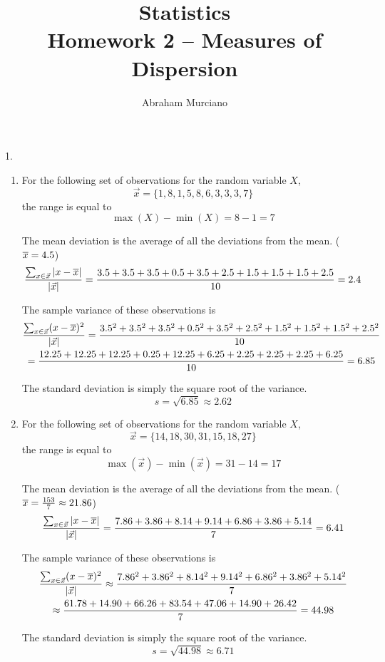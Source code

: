 \documentclass[fleqn]{article}
\title{
	Statistics \\
	\medskip
	\large Homework 2 -- Measures of Dispersion
}
\author{Abraham Murciano}
\begin{document}
\maketitle

\begin{answers}

	\item[1.]
	\begin{enumerate}
		\item %
		For the following set of observations for the random variable \(X\),
		\[\vec{x} = \{1,8,1,5,8,6,3,3,3,7\}\]
		the range is equal to
		\[\max(X) - \min(X) = 8 - 1 = 7\]

		The mean deviation is the average of all the deviations from the mean. (\(\overline{x} = 4.5\))
		\[\frac{\sum_{x \in \vec{x}}|x - \overline{x}|}{|\vec{x}|} = \frac{3.5+3.5+3.5+0.5+3.5+2.5+1.5+1.5+1.5+2.5}{10} = 2.4\]

		The sample variance of these observations is
		\begin{multline*}
			\frac{\sum_{x \in \vec{x}}(x - \overline{x})^2}{|\vec{x}|} = \frac{3.5^2+3.5^2+3.5^2+0.5^2+3.5^2+2.5^2+1.5^2+1.5^2+1.5^2+2.5^2}{10} \\= \frac{12.25+12.25+12.25+0.25+12.25+6.25+2.25+2.25+2.25+6.25}{10} = 6.85
		\end{multline*}

		The standard deviation is simply the square root of the variance.
		\[s = \sqrt{6.85} \approx 2.62\]

		\item %
		For the following set of observations for the random variable \(X\),
		\[\vec{x} = \{14,18,30,31,15,18,27\}\]
		the range is equal to
		\[\max(\vec{x}) - \min(\vec{x}) = 31 - 14 = 17\]

		The mean deviation is the average of all the deviations from the mean. (\(\overline{x} = \frac{153}{7} \approx 21.86\))
		\[\frac{\sum_{x \in \vec{x}}|x - \overline{x}|}{|\vec{x}|} = \frac{7.86+3.86+8.14+9.14+6.86+3.86+5.14}{7} = 6.41\]

		The sample variance of these observations is
		\begin{multline*}
			\frac{\sum_{x \in \vec{x}}(x - \overline{x})^2}{|\vec{x}|} \approx \frac{7.86^2+3.86^2+8.14^2+9.14^2+6.86^2+3.86^2+5.14^2}{7} \\\approx \frac{61.78+14.90+66.26+83.54+47.06+14.90+26.42}{7} = 44.98
		\end{multline*}

		The standard deviation is simply the square root of the variance.
		\[s = \sqrt{44.98} \approx 6.71\]
	\end{enumerate}


\end{answers}
\end{document}
